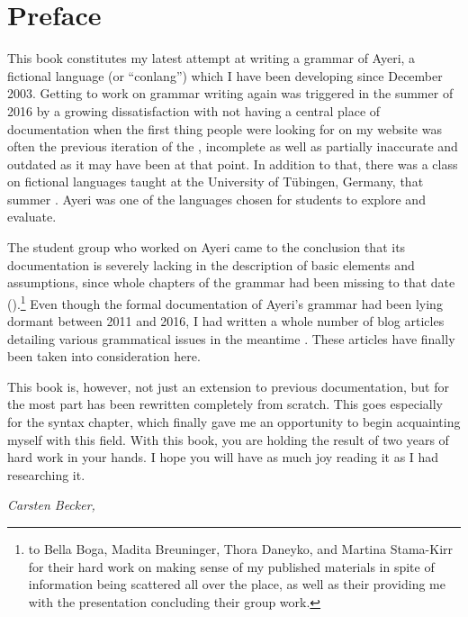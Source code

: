 \chapter{Preface}

This book constitutes my latest attempt at writing a grammar of Ayeri, a
fictional language (or \enquote{conlang}) which I have been developing since
December 2003. Getting to work on grammar writing again was triggered in the
summer of 2016 by a growing dissatisfaction with not having a central place of
documentation when the first thing people were looking for on my website was
often the previous iteration of the , incomplete as well as
partially inaccurate and outdated as it may have been at that point. In
addition to that, there was a class on fictional languages taught at the
University of Tübingen, Germany, that summer \autocite{buch2016ss}. Ayeri was
one of the languages chosen for students to explore and evaluate.

The student group who worked on Ayeri came to the conclusion that its
documentation is severely lacking in the description of basic elements and
assumptions, since whole chapters of the grammar had been missing to that date
(\cite[12]{boga2016}).\footnote{
to Bella Boga, Madita Breuninger, Thora Daneyko, and Martina Stama-Kirr for
their hard work on making sense of my published materials in spite of
information being scattered all over the place, as well as their providing me
with the presentation concluding their group work.} Even though the formal
documentation of Ayeri's grammar had been lying dormant between 2011 and 2016,
I had written a whole number of blog articles detailing various grammatical
issues in the meantime \autocite[Blog]{benung}. These articles have finally
been taken into consideration here.

This book is, however, not just an extension to previous documentation, but for
the most part has been rewritten completely from scratch. This goes especially
for the syntax chapter, which finally gave me an opportunity to begin
acquainting myself with this field. With this book, you are holding the result
of two years of hard work in your hands. I hope you will have as much joy
reading it as I had researching it.

\begin{flushright}\itshape\footnotesize
{}
Carsten Becker,  \the\year
\end{flushright}